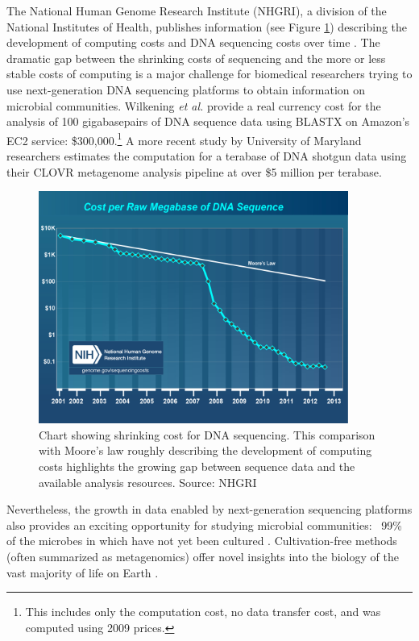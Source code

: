 \documentclass[12pt,fullpage]{report}
\begin{document}
The National Human Genome Research Institute (NHGRI), a division of the National Institutes of Health, publishes information (see Figure \ref{fig:cost_per_megabase}) describing the development of computing costs and DNA sequencing costs over time \cite{NHGRI_COST}. The dramatic gap between the shrinking costs of sequencing and the more or less stable costs of computing is a major challenge for biomedical researchers trying to use next-generation DNA sequencing platforms to obtain information on microbial communities. Wilkening \textit{et al.} \cite{MGCLOUD} provide a real currency cost for the analysis of 100 gigabasepairs of DNA sequence data using BLASTX on Amazon's \gls{EC2} service: \$300,000.\footnote{This includes only the computation cost, no data transfer cost, and was computed using 2009 prices.} A more recent study by University of Maryland researchers \cite{CLOVR} estimates the computation for a terabase of DNA shotgun data using their CLOVR metagenome analysis pipeline at over \$5 million per terabase.

\begin{figure}
\begin{center}
 \includegraphics[width=4in]{Images/cost_per_megabase.png}
\end{center}
\label{fig:cost_per_megabase}
\caption{Chart showing shrinking cost for DNA sequencing. This comparison with Moore's law roughly describing the development of computing costs highlights the growing gap between sequence data and the available analysis resources. Source: NHGRI \cite{NHGRI_COST}
}
\end{figure}

Nevertheless, the growth in data enabled by next-generation sequencing platforms also provides an exciting opportunity for studying microbial communities: ~99\% of the microbes in which have not yet been cultured \cite{MGREVIEW}. Cultivation-free methods (often summarized as metagenomics) offer novel insights into the biology of the vast majority of life on Earth \cite{THOMASREVIEW}.
\end{document}
